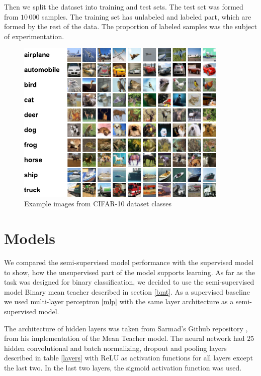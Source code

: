 Then we split the dataset into training and test sets. The test set was formed from $10\,000$ samples. The training set has unlabeled and labeled part, which are formed by the rest of the data. The proportion of labeled samples was the subject of experimentation.

\begin{figure}[h!]
    \centering
    \includegraphics[width=0.9\textwidth]{figs/cifar10-sample-fig.pdf}
    \caption{Example images from CIFAR-10 dataset classes}
    \label{fig:cifar10}
\end{figure}

\section{Models}

We compared the semi-supervised model performance with the supervised model to show, how the unsupervised part of the model supports learning. As far as the task was designed for binary classification, we decided to use the semi-supervised model Binary mean teacher described in section \ref{bmt}. As a supervised baseline we used multi-layer perceptron \ref{mlp} with the same layer architecture as a semi-supervised model. 
 
The architecture of hidden layers was taken from Sarmad's Github repository \cite{sarmad-repo}, from his implementation of the Mean Teacher model. The neural network had $25$ hidden convolutional and batch normalizing, dropout and pooling layers described in table \ref{layers} with ReLU as activation functions for all layers except the last two. In the last two layers, the sigmoid activation function was used.



